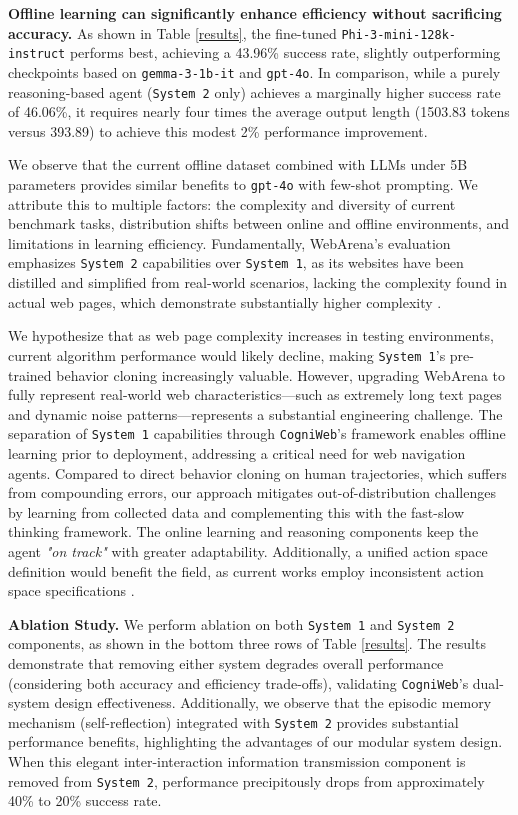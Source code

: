 \documentclass{article}
\begin{document}
\textbf{Offline learning can significantly enhance efficiency without sacrificing accuracy.} As shown in Table \ref{results}, the fine-tuned \texttt{Phi-3-mini-128k-instruct} performs best, achieving a 43.96\% success rate, slightly outperforming checkpoints based on \texttt{gemma-3-1b-it} and \texttt{gpt-4o}. In comparison, while a purely reasoning-based agent (\texttt{System 2} only) achieves a marginally higher success rate of 46.06\%, it requires nearly four times the average output length (1503.83 tokens versus 393.89) to achieve this modest 2\% performance improvement.

We observe that the current offline dataset combined with LLMs under 5B parameters provides similar benefits to \texttt{gpt-4o} with few-shot prompting. We attribute this to multiple factors: the complexity and diversity of current benchmark tasks, distribution shifts between online and offline environments, and limitations in learning efficiency. Fundamentally, WebArena's evaluation emphasizes \texttt{System 2} capabilities over \texttt{System 1}, as its websites have been distilled and simplified from real-world scenarios, lacking the complexity found in actual web pages, which demonstrate substantially higher complexity \citep{liu2024wepowebelementpreference}. 

We hypothesize that as web page complexity increases in testing environments, current algorithm performance would likely decline, making \texttt{System 1}'s pre-trained behavior cloning increasingly valuable. However, upgrading WebArena to fully represent real-world web characteristics—such as extremely long text pages and dynamic noise patterns—represents a substantial engineering challenge. The separation of \texttt{System 1} capabilities through \texttt{CogniWeb}'s framework enables offline learning prior to deployment, addressing a critical need for web navigation agents. Compared to direct behavior cloning on human trajectories, which suffers from compounding errors, our approach mitigates out-of-distribution challenges by learning from collected data and complementing this with the fast-slow thinking framework. The online learning and reasoning components keep the agent \textit{"on track"} with greater adaptability. Additionally, a unified action space definition would benefit the field, as current works employ inconsistent action space specifications \citep{drouin2024workarena}.

\textbf{Ablation Study.} We perform ablation on both \texttt{System 1} and \texttt{System 2} components, as shown in the bottom three rows of Table \ref{results}. The results demonstrate that removing either system degrades overall performance (considering both accuracy and efficiency trade-offs), validating \texttt{CogniWeb}'s dual-system design effectiveness. Additionally, we observe that the episodic memory mechanism (self-reflection) integrated with \texttt{System 2} provides substantial performance benefits, highlighting the advantages of our modular system design. When this elegant inter-interaction information transmission component is removed from \texttt{System 2}, performance precipitously drops from approximately 40\% to 20\% success rate.
\end{document}
